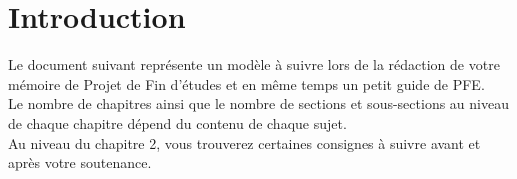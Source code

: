 
\chapter*{Introduction}

Le document suivant représente un modèle à suivre lors de la rédaction de votre mémoire de Projet de Fin d'études et en même temps un petit guide de PFE.\\

Le nombre de chapitres ainsi que le nombre de sections et sous-sections au niveau de chaque chapitre dépend du contenu de chaque sujet.\\

Au niveau du chapitre 2, vous trouverez certaines consignes à suivre avant et après votre soutenance.






